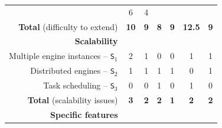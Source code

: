 \documentclass[preprint,3p,twocolumn]{elsarticle}
\newcommand{\correction}[1]{\color{blue}#1\color{black}\xspace}
\begin{document}
\begin{table}
\begin{tabular}{rcccccc}
                                     & \cellcolor[HTML]{999999}6
                                     & \cellcolor[HTML]{99DD99}4\\
  \textbf{Total} (difficulty to extend) & \cellcolor[HTML]{99D299}\textbf{10}
                                     & \cellcolor[HTML]{99D299}\textbf{\correction{9}}
                                     & \cellcolor[HTML]{99FF99}\textbf{8}
                                     & \cellcolor[HTML]{99E899}\textbf{9}
                                     & \cellcolor[HTML]{999999}\textbf{12.5}
                                     & \cellcolor[HTML]{99E899}\textbf{9}\\
\cellcolor[HTML]{EEEEEE}\textbf{Scalability}& \multicolumn{6}{l}{\cellcolor[HTML]{EEEEEE}}\\
Multiple engine instances -- \texttt{S$_1$}& \cellcolor[HTML]{999999}2
                                     & \cellcolor[HTML]{99CC99}1
                                     & \cellcolor[HTML]{99FF99}0
                                     & \cellcolor[HTML]{99FF99}0
                                     & \cellcolor[HTML]{99CC99}1
                                     & \cellcolor[HTML]{99CC99}1\\
Distributed engines -- \texttt{S$_2$}& \cellcolor[HTML]{999999}1
                                     & \cellcolor[HTML]{999999}1
                                     & \cellcolor[HTML]{999999}1
                                     & \cellcolor[HTML]{999999}1
                                     & \cellcolor[HTML]{99FF99}0
                                     & \cellcolor[HTML]{999999}1\\
Task scheduling -- \texttt{S$_3$}    & \cellcolor[HTML]{99FF99}0
                                     & \cellcolor[HTML]{99FF99}0
                                     & \cellcolor[HTML]{999999}1
                                     & \cellcolor[HTML]{99FF99}0
                                     & \cellcolor[HTML]{999999}1
                                     & \cellcolor[HTML]{99FF99}0\\
\textbf{Total} (scalability issues)  & \cellcolor[HTML]{999999}\textbf{3}
                                     & \cellcolor[HTML]{99CC99}\textbf{2}
                                     & \cellcolor[HTML]{99CC99}\textbf{2}
                                     & \cellcolor[HTML]{99FF99}\textbf{1}
                                     & \cellcolor[HTML]{99CC99}\textbf{2}
                                     & \cellcolor[HTML]{99CC99}\textbf{2}\\
\cellcolor[HTML]{EEEEEE}\textbf{Specific features}& \multicolumn{6}{l}{\cellcolor[HTML]{EEEEEE}}\\

\end{tabular}
\end{table}
\end{document}
